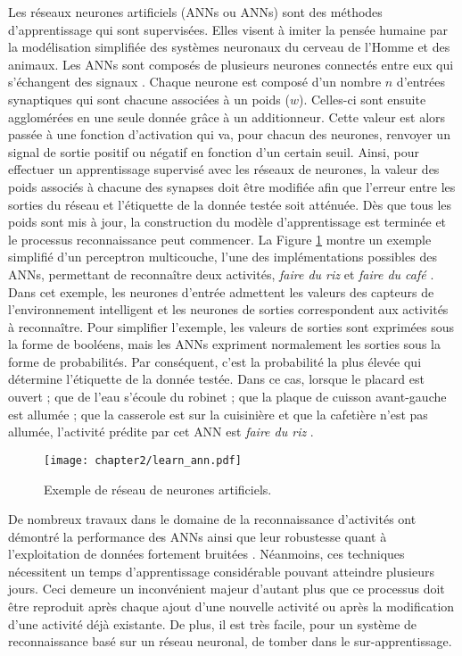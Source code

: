 Les réseaux neurones artificiels (\aclp{ANN} ou \acsp{ANN}) sont des méthodes d'apprentissage qui sont supervisées. Elles visent à imiter la pensée humaine par la modélisation simplifiée des systèmes neuronaux du cerveau de l'Homme et des animaux. Les \acsp{ANN} sont composés de plusieurs neurones connectés entre eux qui s'échangent des signaux \citep{Witten2016}. Chaque neurone est composé d'un nombre $n$ d'entrées synaptiques qui sont chacune associées à un poids ($w$). Celles-ci sont ensuite agglomérées en une seule donnée grâce à un additionneur. Cette valeur est alors passée à une fonction d'activation qui va, pour chacun des neurones, renvoyer un signal de sortie positif ou négatif en fonction d'un certain seuil. Ainsi, pour effectuer un apprentissage supervisé avec les réseaux de neurones, la valeur des poids associés à chacune des synapses doit être modifiée afin que l'erreur entre les sorties du réseau et l'étiquette de la donnée testée soit atténuée. Dès que tous les poids sont mis à jour, la construction du modèle d'apprentissage est terminée et le processus reconnaissance peut commencer. La Figure \ref{fig:learn_ann} montre un exemple simplifié d'un perceptron multicouche, l'une des implémentations possibles des \acsp{ANN}, permettant de reconnaître deux activités, \og \textit{faire du riz} \fg et \og \textit{faire du café} \fg. Dans cet exemple, les neurones d'entrée admettent les valeurs des capteurs de l'environnement intelligent et les neurones de sorties correspondent aux activités à reconnaître. Pour simplifier l'exemple, les valeurs de sorties sont exprimées sous la forme de booléens, mais les \acsp{ANN} expriment normalement les sorties sous la forme de probabilités. Par conséquent, c'est la probabilité la plus élevée qui détermine l'étiquette de la donnée testée. Dans ce cas, lorsque le placard est ouvert ; que de l'eau s'écoule du robinet ; que la plaque de cuisson avant-gauche est allumée ; que la casserole est sur la cuisinière et que la cafetière n'est pas allumée, l'activité prédite par cet \acs{ANN} est \og \textit{faire du riz} \fg.

\begin{figure}[H]
	\centering
	\texttt{[image: chapter2/learn\_ann.pdf]}
	\caption{Exemple de réseau de neurones artificiels.}
	\label{fig:learn_ann}
\end{figure}

De nombreux travaux dans le domaine de la reconnaissance d'activités ont démontré la performance des \acsp{ANN} ainsi que leur robustesse quant à l'exploitation de données fortement bruitées \citep{Parkka2006, Delachaux2013}. Néanmoins, ces techniques nécessitent un temps d'apprentissage considérable pouvant atteindre plusieurs jours. Ceci demeure un inconvénient majeur d'autant plus que ce processus doit être reproduit après chaque ajout d'une nouvelle activité ou après la modification d'une activité déjà existante. De plus, il est très facile, pour un système de reconnaissance basé sur un réseau neuronal, de tomber dans le sur-apprentissage.

